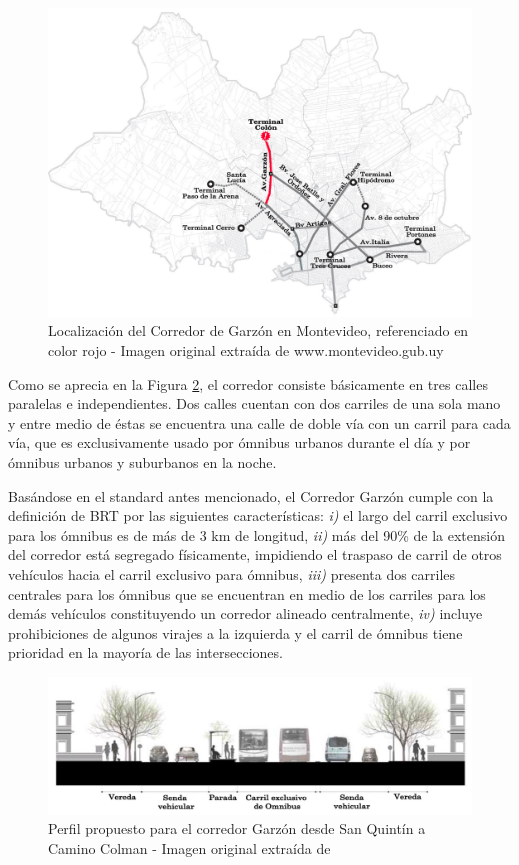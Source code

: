 \begin{figure}
	\centering
	\includegraphics[width=0.99\linewidth]{figures/Mapa_Garzon_0}
	\caption[Localización del Corredor de Garzón en Montevideo]{Localización del Corredor de Garzón en Montevideo, referenciado en color rojo - Imagen original extraída de www.montevideo.gub.uy		
	}
	\label{fig:Mapa_Garzon_0}
\end{figure}

Como se aprecia en la Figura \ref{fig:perfil_garzon}, el corredor consiste básicamente en tres calles paralelas e independientes. Dos calles cuentan con dos carriles de una sola mano y entre medio de éstas se encuentra una calle de doble vía con un carril para cada vía, que es exclusivamente usado por ómnibus urbanos durante el día y por ómnibus urbanos y suburbanos en la noche.

Basándose en el standard antes mencionado, el Corredor Garzón cumple con la definición de BRT por las siguientes características: \textit{i)} el largo del carril exclusivo para los ómnibus es de más de 3 km de longitud, \textit{ii)} más del 90\% de la extensión del corredor está segregado físicamente, impidiendo el traspaso de carril de otros vehículos hacia el carril exclusivo para ómnibus, \textit{iii)} presenta dos carriles centrales para los ómnibus que se encuentran en medio de los carriles para los demás vehículos constituyendo un corredor alineado centralmente, \textit{iv)} incluye prohibiciones de algunos virajes a la izquierda y el carril de ómnibus tiene prioridad en la mayoría de las intersecciones.


\begin{figure}
	\centering
	\includegraphics[width=0.9\linewidth]{Figures/busway_configuration}
	\caption[Perfil propuesto para el corredor Garzón.]{Perfil propuesto para el corredor Garzón desde San Quintín a Camino Colman - Imagen original extraída de \citep{PlanMovilidad}
	}
	\label{fig:perfil_garzon}
\end{figure}

